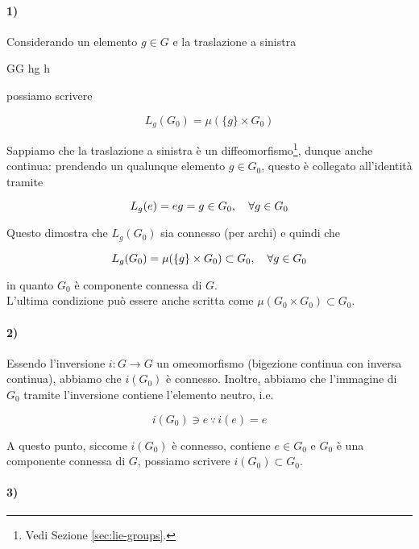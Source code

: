 \paragraph{1)}

Considerando un elemento $ g \in G $ e la traslazione a sinistra

	{G}{G}
	{h}{g h}

possiamo scrivere

\begin{equation}
	L_{g}(G_{0}) = \mu(\{g\} \times G_{0})
\end{equation}

Sappiamo che la traslazione a sinistra è un diffeomorfismo\footnote{%
	Vedi Sezione \ref{sec:lie-groups}.%
}, dunque anche continua: prendendo un qualunque elemento $ g \in G_{0} $, questo è collegato all'identità tramite

\begin{equation}
	L_{g}(e) = e g = g \in G_{0} \qcomma \forall g \in G_{0}
\end{equation}

Questo dimostra che $ L_{g}(G_{0}) $ sia connesso (per archi) e quindi che

\begin{equation}
	L_{g}(G_{0}) = \mu(\{g\} \times G_{0}) \subset G_{0} \qcomma \forall g \in G_{0}
\end{equation}

in quanto $ G_{0} $ è componente connessa di $ G $.\\
L'ultima condizione può essere anche scritta come $ \mu(G_{0} \times G_{0}) \subset G_{0} $.

\paragraph{2)}

Essendo l'inversione $ i : G \to G $ un omeomorfismo (bigezione continua con inversa continua), abbiamo che $ i(G_{0}) $ è connesso. Inoltre, abbiamo che l'immagine di $ G_{0} $ tramite l'inversione contiene l'elemento neutro, i.e.

\begin{equation}
	i(G_{0}) \ni e \, \because \, i(e) = e
\end{equation}

A questo punto, siccome $ i(G_{0}) $ è connesso, contiene $ e \in G_{0} $ e $ G_{0} $ è una componente connessa di $ G $, possiamo scrivere $ i(G_{0}) \subset G_{0} $.

\paragraph{3)}

